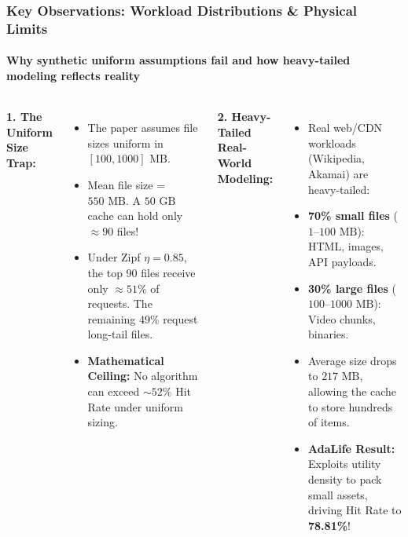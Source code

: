 \documentclass[aspectratio=169, 10pt]{beamer}
\begin{document}
\begin{frame}
    \frametitle{Key Observations: Workload Distributions \& Physical Limits}
    \framesubtitle{Why synthetic uniform assumptions fail and how heavy-tailed modeling reflects reality}

    \begin{columns}[T, onlytextwidth]
        {\color{NavyPrimary}\textbf{1. The Uniform Size Trap:}}
        \begin{itemize}
            \small
            \item The paper assumes file sizes uniform in $[100, 1000]\text{ MB}$.
            \item Mean file size = $550\text{ MB}$. A $50\text{ GB}$ cache can hold only $\approx 90$ files!
            \item Under Zipf $\eta = 0.85$, the top 90 files receive only $\approx 51\%$ of requests. The remaining 49\% request long-tail files.
            \item \textbf{Mathematical Ceiling:} No algorithm can exceed $\sim 52\%$ Hit Rate under uniform sizing.
        \end{itemize}

        {\color{EmeraldGreen}\textbf{2. Heavy-Tailed Real-World Modeling:}}
        \begin{itemize}
            \small
            \item Real web/CDN workloads (Wikipedia, Akamai) are heavy-tailed:
            \item \textbf{70\% small files} ($1\text{--}100\text{ MB}$): HTML, images, API payloads.
            \item \textbf{30\% large files} ($100\text{--}1000\text{ MB}$): Video chunks, binaries.
            \item Average size drops to $217\text{ MB}$, allowing the cache to store hundreds of items.
            \item \textbf{AdaLife Result:} Exploits utility density to pack small assets, driving Hit Rate to \textbf{78.81\%}!
        \end{itemize}
    \end{columns}
\end{frame}
\end{document}
